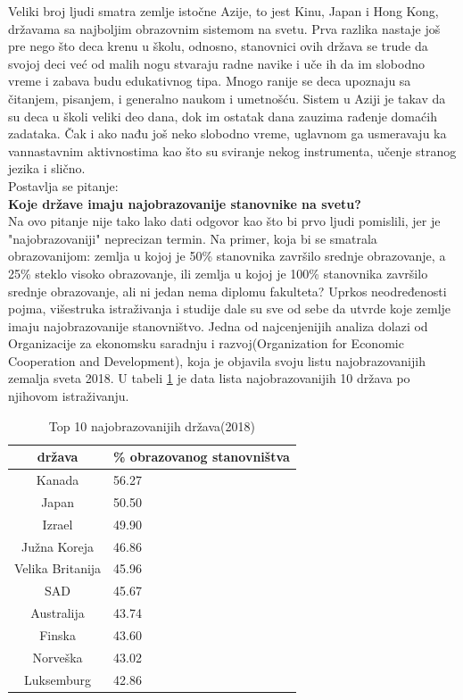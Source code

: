 \documentclass[a4paper]{article}
\begin{document}
Veliki broj ljudi smatra zemlje istočne Azije, to jest Kinu, Japan i Hong Kong, državama sa najboljim obrazovnim sistemom na svetu. Prva razlika nastaje još pre nego što deca krenu u školu, odnosno, stanovnici ovih država se trude da svojoj deci već od malih nogu stvaraju radne navike i uče ih da im slobodno vreme i zabava budu edukativnog tipa. Mnogo ranije se deca upoznaju sa čitanjem, pisanjem, i generalno naukom i umetnošću. Sistem u Aziji je takav da su deca u školi veliki deo dana, dok im ostatak dana zauzima rađenje domaćih zadataka. Čak i ako nađu još neko slobodno vreme, uglavnom ga usmeravaju ka vannastavnim aktivnostima kao što su sviranje nekog instrumenta, učenje stranog jezika i slično.\\
Postavlja se pitanje:\\ \textbf{Koje države imaju najobrazovanije stanovnike na svetu?}\\
Na ovo pitanje nije tako lako dati odgovor kao što bi prvo ljudi pomislili, jer je "najobrazovaniji" neprecizan termin. Na primer, koja bi se smatrala obrazovanijom: zemlja u kojoj je 50\% stanovnika završilo srednje obrazovanje, a 25\% steklo visoko obrazovanje, ili zemlja u kojoj je 100\% stanovnika završilo srednje obrazovanje, ali ni jedan nema diplomu fakulteta?
Uprkos neodređenosti pojma, višestruka istraživanja i studije dale su sve od sebe da utvrde koje zemlje imaju najobrazovanije stanovništvo. Jedna od najcenjenijih analiza dolazi od Organizacije za ekonomsku saradnju i razvoj(Organization for Economic Cooperation and Development), koja je objavila svoju listu najobrazovanijih zemalja sveta 2018. U tabeli  \ref{tab:tabela1} je data lista najobrazovanijih 10 država po njihovom istraživanju.\cite{referenca8}

\begin{table}[h!]
\begin{center}
\caption{Top 10 najobrazovanijih država(2018)}
\begin{tabular}{|c|l|} \hline
\textbf{država}& \textbf{\% obrazovanog stanovništva}\\ \hline
Kanada &56.27\\ \hline
Japan &50.50\\ \hline
Izrael &49.90\\ \hline
Južna Koreja &46.86\\ \hline
Velika Britanija &45.96\\ \hline
SAD &45.67\\ \hline
Australija &43.74\\ \hline
Finska &43.60\\ \hline
Norveška &43.02\\ \hline
Luksemburg &42.86\\ \hline
\end{tabular}
\label{tab:tabela1}
\end{center}
\end{table}
\end{document}
